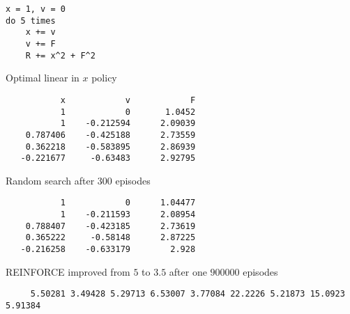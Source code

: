\documentclass[aspectratio=169,8pt]{beamer}
\begin{document}
\eframe

\begin{frame}[fragile]
\begin{verbatim}
x = 1, v = 0
do 5 times
    x += v
    v += F
    R += x^2 + F^2
\end{verbatim}
Optimal linear in $x$ policy \newline
\begin{verbatim}
           x            v            F
           1            0       1.0452
           1    -0.212594      2.09039
    0.787406    -0.425188      2.73559
    0.362218    -0.583895      2.86939
   -0.221677     -0.63483      2.92795
\end{verbatim}
Random search after $300$ episodes \newline
\begin{verbatim}
           1            0      1.04477
           1    -0.211593      2.08954
    0.788407    -0.423185      2.73619
    0.365222     -0.58148      2.87225
   -0.216258    -0.633179        2.928
\end{verbatim}

REINFORCE improved from $5$ to $3.5$ after one $900000$ episodes
\begin{verbatim}
     5.50281 3.49428 5.29713 6.53007 3.77084 22.2226 5.21873 15.0923 5.91384
\end{verbatim}
\end{frame}
\end{document}
